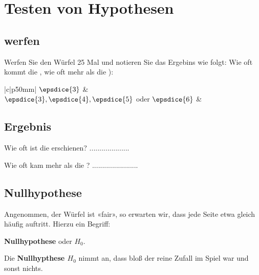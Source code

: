 
\renewcommand{\bbwAufgabenBlockID}{StHyp}

\renewcommand{\metaHeaderLine}{Auftrag: Würfelexperiment}
\renewcommand{\arbeitsblattTitel}{Hypothesentest}


\arbeitsblattHeader{}

\section{Testen von Hypothesen}

\subsection{ werfen}

Werfen Sie den Würfel 25 Mal und notieren Sie das Ergebins wie folgt: Wie oft kommt die , wie oft
mehr als die ):

\begin{bbwFillInTabular}{|c|p{50mm}|}\hline
$\epsdice{3}$ & \\\hline
$\epsdice{3},\epsdice{4},\epsdice{5}$ oder $\epsdice{6}$ & \\\hline
\end{bbwFillInTabular}

\subsection{Ergebnis}

Wie oft ist die  erschienen? ....................
\vspace{15mm}

Wie oft kam mehr als die ? .......................

\newpage


\subsection{Nullhypothese}
Angenommen, der Würfel ist «fair», so erwarten wir, dass jede Seite
etwa gleich häufig auftritt. Hierzu ein Begriff:

\begin{center}\textbf{Nullhypothese} oder {$H_0$}.\end{center}

Die \textbf{Nullhypthese $H_0$} nimmt an, dass bloß der reine Zufall
im Spiel war und sonst nichts.

